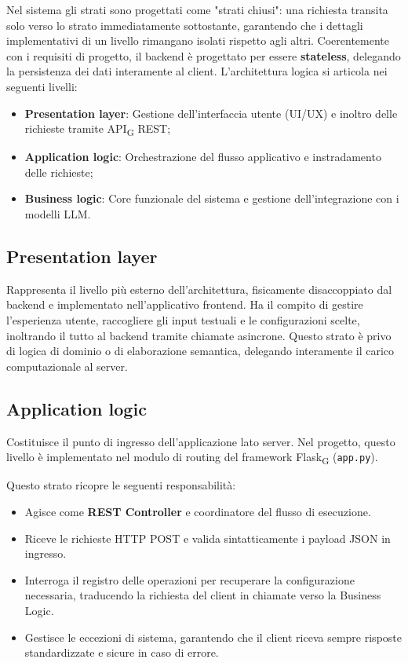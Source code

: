 \documentclass[11pt,a4paper]{article}
\newcommand{\gls}[1]{#1\textsubscript{G}}
\begin{document}
Nel sistema gli strati sono progettati come "strati chiusi": una richiesta transita solo verso lo strato immediatamente sottostante, garantendo che i dettagli implementativi di un livello rimangano isolati rispetto agli altri. Coerentemente con i requisiti di progetto, il backend è progettato per essere \textbf{stateless}, delegando la persistenza dei dati interamente al client. L'architettura logica si articola nei seguenti livelli:
\begin{itemize}
    \item \textbf{Presentation layer}: Gestione dell'interfaccia utente (UI/UX) e inoltro delle richieste tramite \gls{API} REST;
    \item \textbf{Application logic}: Orchestrazione del flusso applicativo e instradamento delle richieste;
    \item \textbf{Business logic}: Core funzionale del sistema e gestione dell'integrazione con i modelli LLM.
\end{itemize}

\subsection{Presentation layer}
Rappresenta il livello più esterno dell'architettura, fisicamente disaccoppiato dal backend e implementato nell'applicativo frontend. Ha il compito di gestire l'esperienza utente, raccogliere gli input testuali e le configurazioni scelte, inoltrando il tutto al backend tramite chiamate asincrone. Questo strato è privo di logica di dominio o di elaborazione semantica, delegando interamente il carico computazionale al server.

\subsection{Application logic}
Costituisce il punto di ingresso dell'applicazione lato server. Nel progetto, questo livello è implementato nel modulo di routing del framework \gls{Flask} (\texttt{app.py}).

Questo strato ricopre le seguenti responsabilità:
\begin{itemize}
    \item Agisce come \textbf{REST Controller} e coordinatore del flusso di esecuzione.
    \item Riceve le richieste HTTP POST e valida sintatticamente i payload JSON in ingresso.
    \item Interroga il registro delle operazioni per recuperare la configurazione necessaria, traducendo la richiesta del client in chiamate verso la Business Logic.
    \item Gestisce le eccezioni di sistema, garantendo che il client riceva sempre risposte standardizzate e sicure in caso di errore.
\end{itemize}
\end{document}

